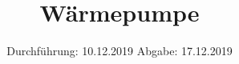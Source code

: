 

\subject{Versuchsnummer: 206}
\title{Wärmepumpe}
\date{%
  Durchführung: 10.12.2019
  \hspace{3em}
  Abgabe: 17.12.2019
}



\maketitle
\thispagestyle{empty}
\tableofcontents
\newpage






\label{messwerte}

\newpage
\nocite{*}
\printbibliography


